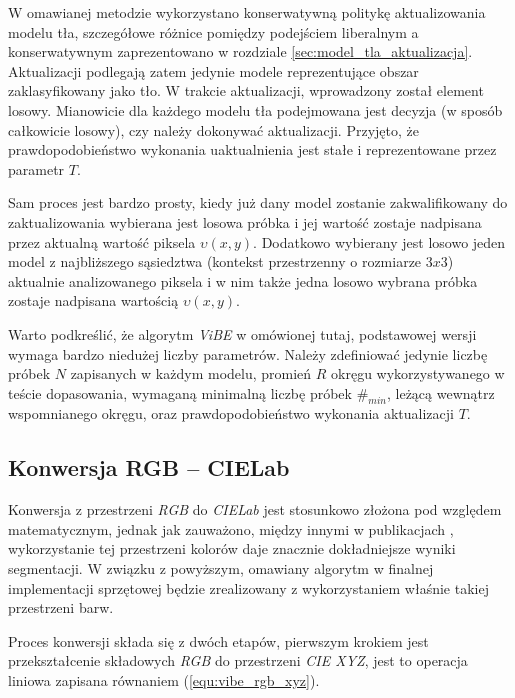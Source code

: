 W omawianej metodzie wykorzystano konserwatywną politykę aktualizowania modelu tła, szczegółowe różnice pomiędzy podejściem liberalnym a konserwatywnym zaprezentowano w rozdziale \ref{sec:model_tla_aktualizacja}. Aktualizacji podlegają zatem jedynie modele reprezentujące obszar zaklasyfikowany jako tło. W trakcie aktualizacji, wprowadzony został element losowy. Mianowicie dla każdego modelu tła podejmowana jest decyzja (w sposób całkowicie losowy), czy należy dokonywać aktualizacji. Przyjęto, że prawdopodobieństwo wykonania uaktualnienia jest stałe i reprezentowane przez parametr $T$. 

Sam proces jest bardzo prosty, kiedy już dany model zostanie zakwalifikowany do zaktualizowania wybierana jest losowa próbka i jej wartość zostaje nadpisana przez aktualną wartość piksela $\upsilon(x,y)$. Dodatkowo wybierany jest losowo jeden model z najbliższego sąsiedztwa (kontekst przestrzenny o rozmiarze $3x3$) aktualnie analizowanego piksela i w nim także jedna losowo wybrana próbka zostaje nadpisana wartością $\upsilon(x,y)$.

Warto podkreślić, że algorytm \textit{ViBE} w omówionej tutaj, podstawowej wersji wymaga bardzo niedużej liczby parametrów. Należy zdefiniować jedynie liczbę próbek $N$ zapisanych w każdym modelu, promień $R$ okręgu wykorzystywanego w teście dopasowania, wymaganą minimalną liczbę próbek $\#_{min}$, leżącą wewnątrz wspomnianego okręgu, oraz prawdopodobieństwo wykonania aktualizacji $T$.


\subsection{Konwersja RGB -- CIELab}
\label{subsec:vibe_cielab}

Konwersja z przestrzeni \textit{RGB} do \textit{CIELab} jest stosunkowo złożona pod względem matematycznym, jednak jak zauważono, między innymi w publikacjach \cite{kryjak_13_vibe, kryjak_14_vibe}, wykorzystanie tej przestrzeni kolorów daje znacznie dokładniejsze wyniki segmentacji. W związku z powyższym, omawiany algorytm w finalnej implementacji sprzętowej będzie zrealizowany z wykorzystaniem właśnie takiej przestrzeni barw. 

Proces konwersji składa się z dwóch etapów, pierwszym krokiem jest przekształcenie składowych \textit{RGB} do przestrzeni \textit{CIE XYZ}, jest to operacja liniowa zapisana równaniem (\ref{equ:vibe_rgb_xyz}).

